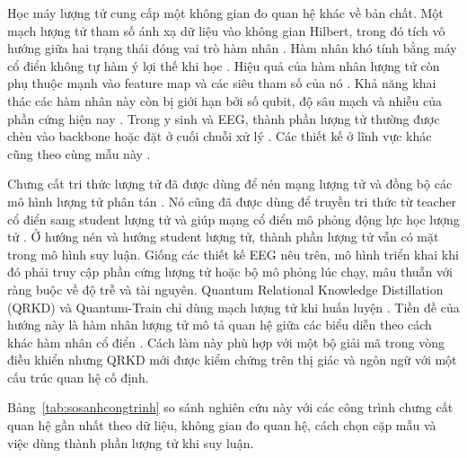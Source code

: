 Học máy lượng tử cung cấp một không gian đo quan hệ khác về bản chất. Một
mạch lượng tử tham số ánh xạ dữ liệu vào không gian Hilbert, trong đó tích
vô hướng giữa hai trạng thái đóng vai trò hàm nhân \cite{schuld2019quantum,
schuld2020circuitcentric, jerbi2023quantum}. Hàm nhân khó tính bằng máy cổ
điển không tự hàm ý lợi thế khi học \cite{huang2021power}. Hiệu quả của hàm nhân lượng tử còn phụ thuộc mạnh vào feature map và các
siêu tham số của nó \cite{jha2026comparative}. Khả năng khai thác các hàm
nhân này còn bị giới hạn bởi số qubit, độ sâu mạch và nhiễu của phần cứng
hiện nay \cite{xie2025advances, alam2022qnet}. Trong y sinh và EEG, thành phần lượng tử thường được chèn vào backbone
hoặc đặt ở cuối chuỗi xử lý \cite{idzikowski2026survey, chen2026exploring,
olvera2024eegbased, behera2026qsvmqnn, dutta2026duoqepinet}. Các thiết kế ở
lĩnh vực khác cũng theo cùng mẫu này
\cite{wang2022development, griol-barres2021variational, qi2024qtnvqc}.

Chưng cất tri thức lượng tử đã được dùng để nén mạng lượng tử
\cite{yan2026distilling} và đồng bộ các mô hình lượng tử phân tán
\cite{oh2025quantum}. Nó cũng đã được dùng để truyền tri thức từ teacher cổ
điển sang student lượng tử \cite{nishan2026quantummedkd,
barbato2026quantum} và giúp mạng cổ điển mô phỏng động lực học lượng tử
\cite{yao2023emulating}. Ở hướng nén và hướng student lượng tử, thành phần
lượng tử vẫn có mặt trong mô hình suy luận. Giống các thiết kế EEG nêu trên,
mô hình triển khai khi đó phải truy cập phần cứng lượng tử hoặc bộ mô phỏng lúc
chạy, mâu thuẫn với ràng buộc về độ trễ và tài nguyên. Quantum Relational
Knowledge Distillation (QRKD) và Quantum-Train chỉ dùng mạch lượng tử khi huấn luyện \cite{liu2025quantum,
liu2025quantumtrain}. Tiền đề của hướng này là hàm nhân lượng tử mô tả quan
hệ giữa các biểu diễn theo cách khác hàm nhân cổ điển
\cite{liu2022representation}. Cách làm này phù hợp với một bộ
giải mã trong vòng điều khiển nhưng QRKD mới được kiểm chứng trên thị giác
và ngôn ngữ với một cấu trúc quan hệ cố định.

Bảng~\ref{tab:sosanhcongtrinh} so sánh nghiên cứu này với các công trình
chưng cất quan hệ gần nhất theo dữ liệu, không gian đo quan hệ, cách chọn cặp
mẫu và việc dùng thành phần lượng tử khi suy luận.

